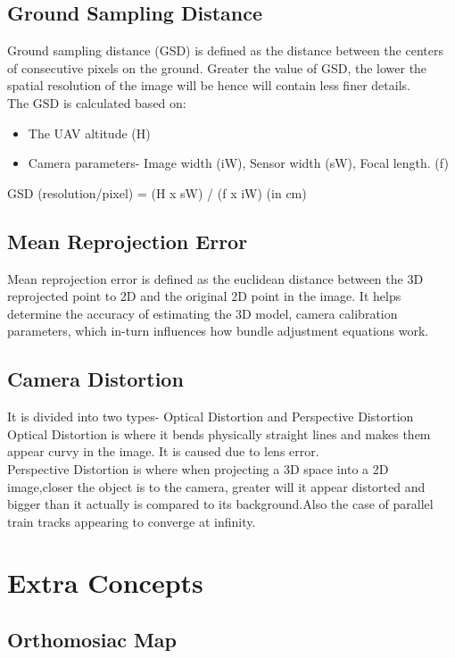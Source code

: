 \documentclass[11pt,twocolumn,letterpaper]{article}
\begin{document}
\subsection{Ground Sampling Distance}

Ground sampling distance (GSD) is defined as the distance between the centers of consecutive pixels on the ground. Greater the value of GSD, the lower the spatial resolution of the image will be hence will contain less finer details.
\\The GSD is calculated based on:
\begin{itemize}
    \item The UAV altitude (H)
    \item Camera parameters- Image width (iW), Sensor width (sW), Focal length. (f)
\end{itemize}

GSD (resolution/pixel) = (H x sW) / (f x iW) (in cm)


\subsection{Mean Reprojection Error}
Mean reprojection error is defined as the euclidean distance between the 3D reprojected point to 2D and the original 2D point in the image. It helps determine the accuracy of estimating the 3D model, camera calibration parameters, which in-turn influences how bundle adjustment equations work. 


\subsection{Camera Distortion}
It is divided into two types- Optical Distortion and Perspective Distortion
\\Optical Distortion is where it bends physically straight lines and makes them appear curvy in the image. It is caused due to lens error.
\\ Perspective Distortion is where when projecting a 3D space into a 2D image,closer the object is to the camera, greater will it appear distorted and bigger than it actually is compared to its background.Also the case of parallel train tracks appearing to converge at infinity.



\section{Extra Concepts}
\subsection{Orthomosiac Map}
\end{document}

